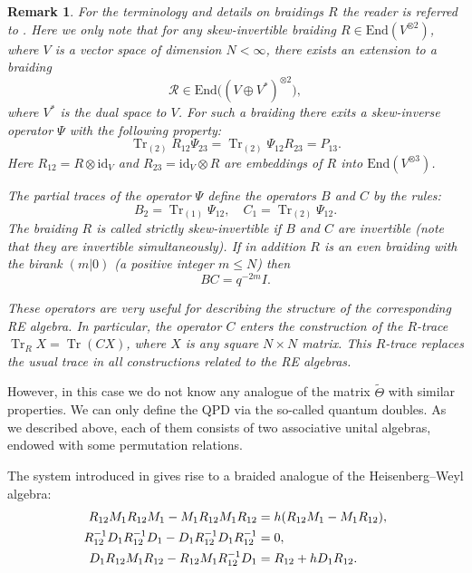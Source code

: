 \documentclass[10pt,a4paper]{amsart}
\DeclareMathOperator{\Tr}{Tr}
\newcommand{\ot}{\otimes}
\newcommand{\tatt}{\widetilde{\Theta}}
\numberwithin{equation}{section}
\newtheorem{remark}[theorem]{Remark}
\begin{document}
\begin{remark}
For the terminology and details on braidings $R$ the reader is referred to \cite{GPS1}. Here we only note that for any
skew-invertible braiding $R\in \mathrm{End}(V^{\otimes 2})$, where $V$ is a vector space of dimension $N<\infty$,
there exists an extension to a braiding
\[
\mathcal{R}\in \mathrm{End}\big((V\oplus  V^*)^{\ot 2}\big),
\]
where $V^*$ is the dual space to $V$. For such a braiding there exits a skew-inverse operator $\Psi$ with the
following property:
\begin{equation}
\Tr_{(2)}R_{12}\Psi_{23} = \Tr_{(2)}\Psi_{12}R_{23} = P_{13}.
\label{def-psi}
\end{equation}
Here $R_{12} = R\otimes \mathrm{id}_V$ and $R_{23} = \mathrm{id}_V\otimes R$ are embeddings of $R$ into
$\mathrm{End}(V^{\otimes 3})$.

The partial traces of the operator $\Psi$ define the operators $B$ and $C$ by the rules:
\[
B_2 = \Tr_{(1)}\Psi_{12}, \quad C_1 = \Tr_{(2)}\Psi_{12}.
\]
The braiding $R$ is called strictly skew-invertible if $B$ and  $C$ are invertible (note that they are invertible simultaneously). If in addition $R$ is an even
braiding with the birank $(m|0)$ (a positive integer $m\le N$) then
\[
BC = q^{-2m}I.
\]

These operators are very useful for describing the structure of the corresponding RE algebra. In particular, the operator $C$ enters
the construction of the $R$-trace $\Tr_R X=\Tr (C X)$, where $X$ is any square $N\times N$ matrix. This $R$-trace replaces the
usual trace in all constructions related to the RE algebras.
\end{remark}

However, in this case  we do not know any analogue of the matrix $\tatt$ with similar properties.
We can only define the QPD  via the so-called quantum doubles. As we described above,
each of them consists of two associative  unital algebras, endowed with some permutation relations.

The system introduced in \cite{GPS2} gives rise to a braided analogue of the Heisenberg--Weyl algebra:
\begin{align}
R_{12}M_1R_{12}M_1-M_1R_{12}M_1R_{12}
&=h(R_{12}M_1-M_1R_{12}), \notag\\
R_{12}^{-1}D_1R_{12}^{-1}D_1-D_1R_{12}^{-1}D_1R_{12}^{-1}
&=0, \label{q-Weyl}\\
D_1R_{12}M_1R_{12}-R_{12}M_1R_{12}^{-1}D_1
&=R_{12}+hD_1R_{12}. \notag
\end{align}
\end{document}
